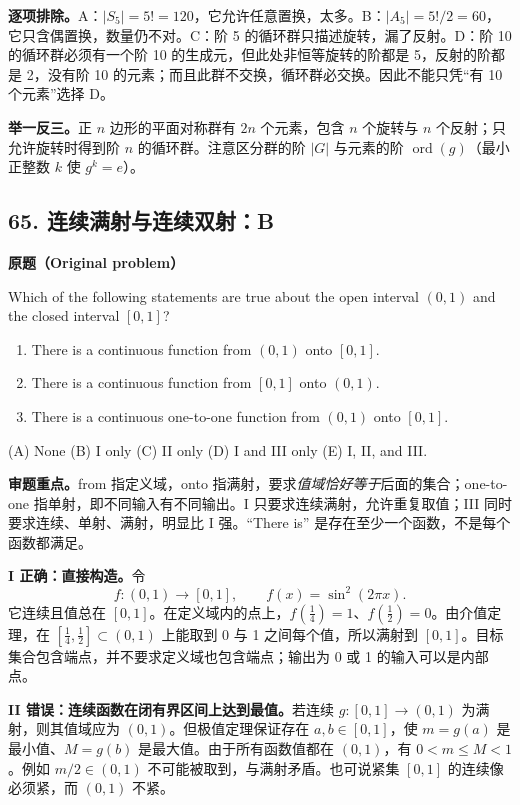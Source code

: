 \documentclass[11pt,a4paper,fontset=fandol]{ctexart}
\begin{document}
\textbf{逐项排除。}A：$|S_5|=5!=120$，它允许任意置换，太多。B：$|A_5|=5!/2=60$，它只含偶置换，数量仍不对。C：阶 5 的循环群只描述旋转，漏了反射。D：阶 10 的循环群必须有一个阶 10 的生成元，但此处非恒等旋转的阶都是 5，反射的阶都是 2，没有阶 10 的元素；而且此群不交换，循环群必交换。因此不能只凭“有 10 个元素”选择 D。

\textbf{举一反三。}正 $n$ 边形的平面对称群有 $2n$ 个元素，包含 $n$ 个旋转与 $n$ 个反射；只允许旋转时得到阶 $n$ 的循环群。注意区分群的阶 $|G|$ 与元素的阶 $\operatorname{ord}(g)$（最小正整数 $k$ 使 $g^k=e$）。

\subsection{65. 连续满射与连续双射：B}
\label{p2:q65}
\textbf{原题（Original problem）}

Which of the following statements are true about the open interval $(0,1)$ and the closed interval $[0,1]$?
\begin{enumerate}[label=\Roman*.]
\item There is a continuous function from $(0,1)$ onto $[0,1]$.
\item There is a continuous function from $[0,1]$ onto $(0,1)$.
\item There is a continuous one-to-one function from $(0,1)$ onto $[0,1]$.
\end{enumerate}
(A) None \quad (B) I only \quad (C) II only \quad (D) I and III only \quad (E) I, II, and III.

\textbf{审题重点。}from 指定义域，onto 指满射，要求\emph{值域恰好等于}后面的集合；one-to-one 指单射，即不同输入有不同输出。I 只要求连续满射，允许重复取值；III 同时要求连续、单射、满射，明显比 I 强。``There is'' 是存在至少一个函数，不是每个函数都满足。

\textbf{I 正确：直接构造。}令
\[
f:(0,1)\to[0,1],\qquad f(x)=\sin^2(2\pi x).
\]
它连续且值总在 $[0,1]$。在定义域内的点上，$f(\frac14)=1$、$f(\frac12)=0$。由介值定理，在 $[\frac14,\frac12]\subset(0,1)$ 上能取到 0 与 1 之间每个值，所以满射到 $[0,1]$。目标集合包含端点，并不要求定义域也包含端点；输出为 0 或 1 的输入可以是内部点。

\textbf{II 错误：连续函数在闭有界区间上达到最值。}若连续 $g:[0,1]\to(0,1)$ 为满射，则其值域应为 $(0,1)$。但极值定理保证存在 $a,b\in[0,1]$，使 $m=g(a)$ 是最小值、$M=g(b)$ 是最大值。由于所有函数值都在 $(0,1)$，有 $0<m\le M<1$。例如 $m/2\in(0,1)$ 不可能被取到，与满射矛盾。也可说紧集 $[0,1]$ 的连续像必须紧，而 $(0,1)$ 不紧。
\end{document}
